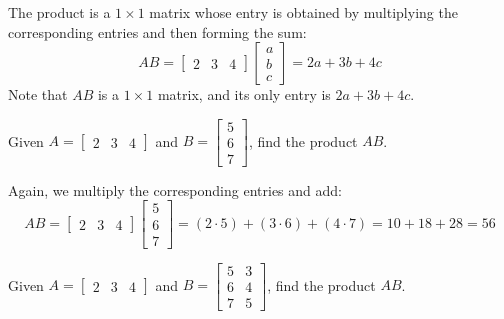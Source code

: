 \begin{solution}
    The product is a $1 \times 1$ matrix whose entry is obtained by multiplying the corresponding entries and then forming the sum:
    \[
        AB = \begin{bmatrix} 2 & 3 & 4 \end{bmatrix} \begin{bmatrix} a \\ b \\ c \end{bmatrix} = 2a + 3b + 4c
    \]
    Note that $AB$ is a $1 \times 1$ matrix, and its only entry is $2a + 3b + 4c$.
\end{solution}

\begin{example}
    Given $A = \begin{bmatrix} 2 & 3 & 4 \end{bmatrix}$ and $B = \begin{bmatrix} 5 \\ 6 \\ 7 \end{bmatrix}$, find the product $AB$.
\end{example}

\begin{solution}
    Again, we multiply the corresponding entries and add:
    \[
        AB = \begin{bmatrix} 2 & 3 & 4 \end{bmatrix} \begin{bmatrix} 5 \\ 6 \\ 7 \end{bmatrix} = (2 \cdot 5) + (3 \cdot 6) + (4 \cdot 7) = 10 + 18 + 28 = 56
    \]
\end{solution}

\begin{example}
    Given $A = \begin{bmatrix} 2 & 3 & 4 \end{bmatrix}$ and $B = \begin{bmatrix} 5 & 3 \\ 6 & 4 \\ 7 & 5 \end{bmatrix}$, find the product $AB$.
\end{example}

